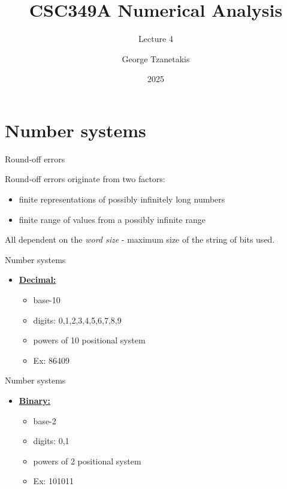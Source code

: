 \documentclass[12pt]{beamer}
\title[CSC349A Numerical Analysis]{CSC349A Numerical Analysis}
\subtitle[Leture 4]{Lecture 4}
\date[2025]{2025}
\author[George Tzanetakis]{George Tzanetakis}
\institute[University of Victoria]{University of Victoria}
\begin{document}
\frame{\maketitle} %



\section{Number systems}

\begin{frame}{Round-off errors}

Round-off errors originate from two factors:

\begin{itemize}
\item{finite representations of possibly infinitely long numbers}
\item{finite range of values from a possibly infinite range}
\end{itemize}

All dependent on the {\it word size} - maximum size of the string of bits used.

\end{frame}

\begin{frame}{Number systems}
\begin{itemize}
\item{\underline{\bf Decimal:}}
\begin{itemize}
\item{base-10}
\item{digits: 0,1,2,3,4,5,6,7,8,9}
\item{powers of 10 positional system}
\item{Ex: 86409}
\end{itemize}
\end{itemize}
\vspace{3 in}
\end{frame}

\begin{frame}{Number systems}
\begin{itemize}
\item{\underline{\bf Binary:}}
\begin{itemize}
\item{base-2}
\item{digits: 0,1}
\item{powers of 2 positional system}
\item{Ex: 101011}
\end{itemize}
\end{itemize}
\vspace{3 in}
\end{frame}
\end{document}
